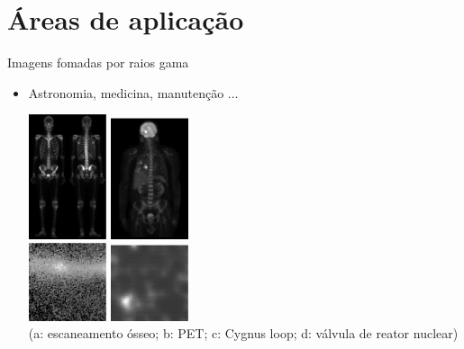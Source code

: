    \section[ slide = true]{Áreas de aplicação}
   \begin{slide}[toc=]{Imagens fomadas por raios gama}
      \begin{itemize}
         \item Astronomia, medicina, manutenção ...
         \begin{center}
		 \includegraphics[width=0.18\textwidth]{figs/Fig0106a}
		 \includegraphics[width=0.18\textwidth]{figs/Fig0106b}\\
		 \includegraphics[width=0.18\textwidth]{figs/Fig0106c}
		 \includegraphics[width=0.18\textwidth]{figs/Fig0106d}\\
         \tiny{(a: escaneamento ósseo; b: PET; c: Cygnus loop; d: válvula de reator nuclear)}
         \end{center}
      \end{itemize}
   \end{slide}
   
